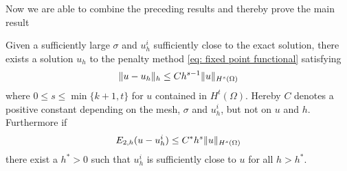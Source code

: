 Now we are able to combine the preceding results and thereby prove the main result
\begin{theorem}\label{main result}
	Given a sufficiently large $\sigma$ and $u_h^i$ sufficiently close to the exact solution, there exists a solution $u_h$ to the penalty method \eqref{eq: fixed point functional} satisfying
	\begin{align}
		\lVert u-u_h \rVert_{h} \leq C h^{s-1} \lVert u \rVert_{H^{s}(\Omega)} \label{eq: error estimate}
	\end{align}
	where $0 \leq s \leq \min\{k+1, t\}$ for $u$ contained in $H^t(\Omega)$. Hereby $C$ denotes a positive constant depending on the mesh, $\sigma$ and $u^i_h$, but not on $u$ and $h$.\\
	Furthermore if
	\[
		E_{2,h}(u-u_h^i) \leq C^* h^{s} \lVert u \rVert_{H^s(\Omega)}
	\]	
	there exist a $h^*> 0$ such that $u_h^i$ is sufficiently close to $u$ for all $h > h^*$.
	
\end{theorem}
